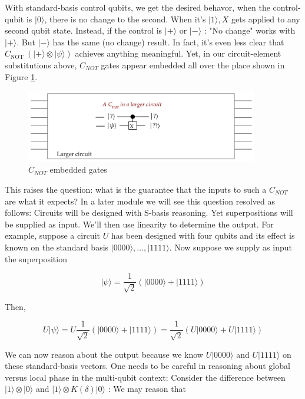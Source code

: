 \documentclass[main.tex]{subfiles}
\begin{document}
    With standard-basis control qubits, we get the desired behavor, when the control-qubit is $|0\rangle$, there is no change to the second. When it's $|1\rangle, X$ gets applied to any second qubit state.
    Instead, if the control is $|+\rangle$ or $|-\rangle$ : "No change" works with $|+\rangle$. But $|-\rangle$ has the same (no change) result. In fact, it's even less clear that $C_{\text {NOT }}(|+\rangle \otimes|\psi\rangle)$ achieves anything meaningful. Yet, in our circuit-element substitutions above, $C_{N O T}$ gates appear embedded all over the place shown in Figure \ref{fig:48caveat2}.

    \begin{figure}
        \centering
        \includegraphics[width=4in]{notes/figs/n08/48caveat2.png}
        \caption{$C_{NOT}$ embedded gates}
        \label{fig:48caveat2}
    \end{figure}
    
    This raises the question: what is the guarantee that the inputs to such a $C_{N O T}$ are what it expects? In a later module we will see this question resolved as follows: Circuits will be designed with S-basis reasoning. Yet superpositions will be supplied as input. We'll then use linearity to determine the output. For example, suppose a circuit $U$ has been designed with four qubits and its effect is known on the standard basis $|0000\rangle, \ldots,|1111\rangle$. Now suppose we supply as input the superposition
    
    $$
    |\psi\rangle=\frac{1}{\sqrt{2}}(|0000\rangle+|1111\rangle)
    $$
    
    Then,
    
    $$
    U|\psi\rangle=U \frac{1}{\sqrt{2}}(|0000\rangle+|1111\rangle)=\frac{1}{\sqrt{2}}(U|0000\rangle+U|1111\rangle)
    $$
    
    We can now reason about the output because we know $U|0000\rangle$ and $U|1111\rangle$ on these standard-basis vectors. One needs to be careful in reasoning about global versus local phase in the multi-qubit context: Consider the difference between $|1\rangle \otimes|0\rangle$ and $|1\rangle \otimes K(\delta)|0\rangle$ : We may reason that
    
\end{document}
